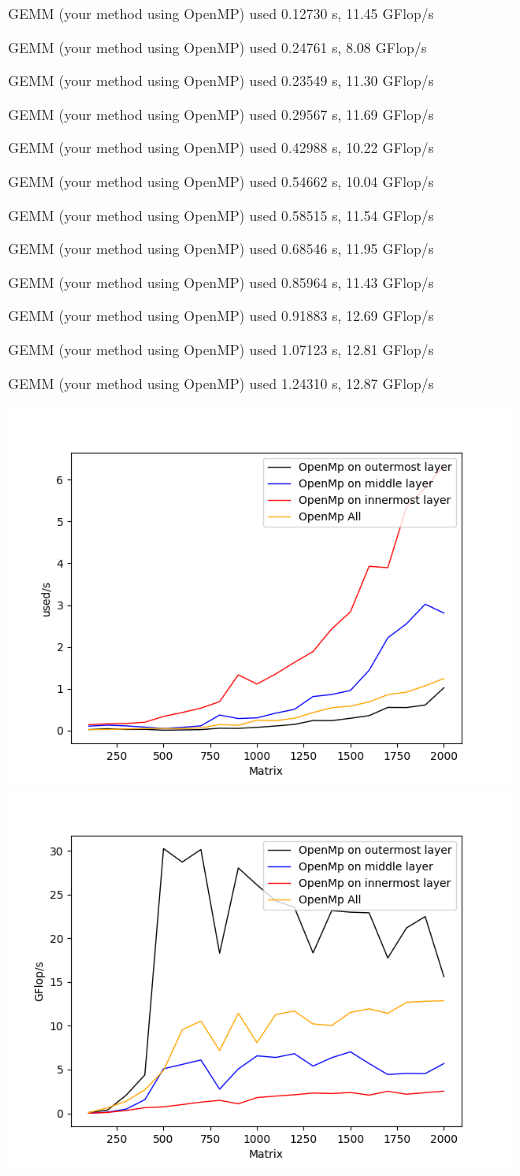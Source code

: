 \documentclass[12pt]{article}
\begin{document}
GEMM (your method using OpenMP) used 0.12730 s, 11.45 GFlop/s

GEMM (your method using OpenMP) used 0.24761 s, 8.08 GFlop/s

GEMM (your method using OpenMP) used 0.23549 s, 11.30 GFlop/s

GEMM (your method using OpenMP) used 0.29567 s, 11.69 GFlop/s

GEMM (your method using OpenMP) used 0.42988 s, 10.22 GFlop/s

GEMM (your method using OpenMP) used 0.54662 s, 10.04 GFlop/s

GEMM (your method using OpenMP) used 0.58515 s, 11.54 GFlop/s

GEMM (your method using OpenMP) used 0.68546 s, 11.95 GFlop/s

GEMM (your method using OpenMP) used 0.85964 s, 11.43 GFlop/s

GEMM (your method using OpenMP) used 0.91883 s, 12.69 GFlop/s

GEMM (your method using OpenMP) used 1.07123 s, 12.81 GFlop/s

GEMM (your method using OpenMP) used 1.24310 s, 12.87 GFlop/s

\includegraphics[scale=0.5]{3s}
\includegraphics[scale=0.5]{3g}
\end{document}
